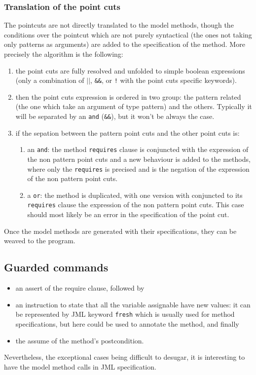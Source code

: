 \subsubsection{Translation of the point cuts}
The pointcuts are not directly translated to the model methods, though
the conditions over the pointcut which are not purely syntactical (the
ones not taking only patterns as arguments) are added to the
specification of the method.  More precisely the algorithm is the
following:
\begin{enumerate}
\item 
the point cuts are fully resolved and unfolded to simple boolean
expressions (only a combination of {\tt $||$}, {\tt \&\&}, or {\tt !}
with the point cuts specific keywords).
\item 
then the point cuts expression is ordered in two group: the pattern
related (the one which take an argument of type pattern) and the
others. Typically it will be separated by an {\tt and} ({\tt \&\&}),
but it won't be always the case.
\item 
if the sepation between the pattern point cuts and the other point
cuts is:
\begin{enumerate}
\item 
an {\tt and}: the method {\tt requires} clause is conjuncted with the
expression of the non pattern point cuts and a new behaviour is added
to the methods, where only the {\tt requires} is precised and is the
negation of the expression of the non pattern point cuts.
\item 
a {\tt or}: the method is duplicated, with one version with conjuncted
 to its {\tt requires} clause the expression of the non pattern point
 cuts. This case should most likely be an error in the specification
 of the point cut.
\end{enumerate}
\end{enumerate}
Once the model methods are generated with their specifications, they
can be weaved to the program.



\subsection{Guarded commands}
\label{gc}
\begin{itemize} 
\item 
an assert of the require clause, followed by
\item 
an instruction to state that all the variable assignable have new
values: it can be represented by JML keyword {\tt fresh} which is
usually used for method specifications, but here could be used to
annotate the method, and finally
\item the assume of the method's postcondition.
\end{itemize}
Nevertheless, the exceptional cases being difficult to desugar, it is
interesting to have the model method calls in JML specification.

